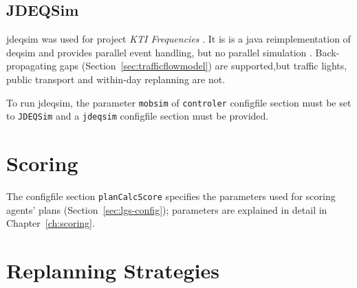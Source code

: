 
\subsection{JDEQSim}
\label{sec:using-jdeqsim}
\gls{jdeqsim} \citep[][]{WaraichEtAl_STRC_2009} was used for project \emph{KTI Frequencies} \citep[][]{BalmerEtAl_ResRep_datapuls_2010}. It is is a \gls{java} reimplementation of \gls{deqsim} \citep[][]{WaraichEtAl_STRC_2009, CharyparEtAl_TRR_2007, CharyparEtAl_TRB_2009} and provides parallel event handling, but no parallel simulation \citep[][p.11]{BalmerEtAl_ResRep_datapuls_2010}. Back-propagating gaps (Section~\ref{sec:trafficflowmodel}) are supported,but traffic lights, public transport and within-day replanning are not.

To run \gls{jdeqsim}, the parameter \lstinline|mobsim| of \lstinline|controler| \gls{configfile} section must be set to \lstinline|JDEQSim| and a \lstinline|jdeqsim| \gls{configfile} section must be provided. 

\section{Scoring}
\label{sec:using-scoring}
The \gls{configfile} section \lstinline|planCalcScore| specifies the parameters used for scoring agents' plans (Section~\ref{sec:lgs-config}); parameters are explained in detail in Chapter~\ref{ch:scoring}.


\section{Replanning Strategies}
\label{sec:strategymodules}

